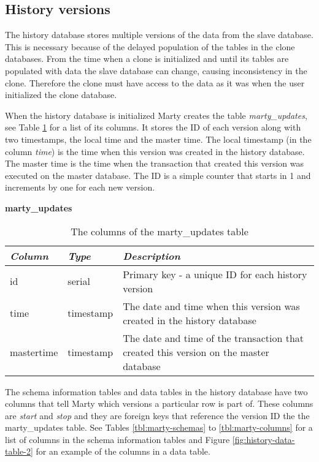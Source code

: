 \subsection{History versions}
\label{ch:implementation-history-versions}
The history database stores multiple versions of the data from the slave database.
This is necessary because of the delayed population of the tables in the clone databases.
From the time when a clone is initialized and until its tables are populated with data the slave database can change, causing inconsistency in the clone.
Therefore the clone must have access to the data as it was when the user initialized the clone database.

When the history database is initialized Marty creates the table \textit{marty\_updates}, see Table \ref{tbl:marty-updates} for a list of its columns.
It stores the ID of each version along with two timestamps, the local time and the master time.
The local timestamp (in the column \textit{time}) is the time when this version was created in the history database.
The master time is the time when the transaction that created this version was executed on the master database.
The ID is a simple counter that starts in 1 and increments by one for each new version.

\begin{table}[h]
  \centering
  \textbf{marty\_updates}
  \begin{tabularx}{\textwidth}{llX}
    \textit{Column} & \textit{Type} & \textit{Description} \\
    \midrule
    id & serial & Primary key - a unique ID for each history version \\
    time & timestamp & The date and time when this version was created in the history database \\
    mastertime & timestamp & The date and time of the transaction that created this version on the master database \\
  \end{tabularx}
  \caption{ The columns of the marty\_updates table}
  \label{tbl:marty-updates}
\end{table}

The schema information tables and data tables in the history database have two columns that tell Marty which versions a particular row is part of.
These columns are \textit{start} and \textit{stop} and they are foreign keys that reference the version ID the the marty\_updates table.
See Tables \ref{tbl:marty-schemas} to \ref{tbl:marty-columns} for a list of columns in the schema information tables and Figure \ref{fig:history-data-table-2} for an example of the columns in a data table.

